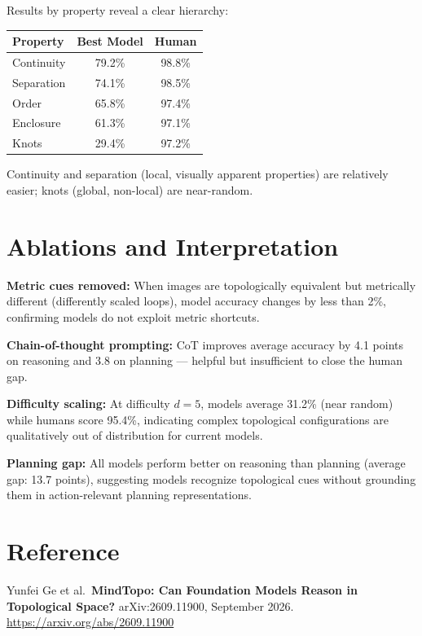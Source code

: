 \documentclass[10pt,twocolumn]{article}
\begin{document}
\vspace{4pt}

Results by property reveal a clear hierarchy:

\begin{center}
\begin{tabular}{lcc}
\toprule
Property & Best Model & Human \\
\midrule
Continuity  & 79.2\% & 98.8\% \\
Separation  & 74.1\% & 98.5\% \\
Order       & 65.8\% & 97.4\% \\
Enclosure   & 61.3\% & 97.1\% \\
Knots       & 29.4\% & 97.2\% \\
\bottomrule
\end{tabular}
\end{center}

Continuity and separation (local, visually apparent properties) are
relatively easier; knots (global, non-local) are near-random.

\section{Ablations and Interpretation}

\textbf{Metric cues removed:} When images are topologically equivalent
but metrically different (differently scaled loops), model accuracy
changes by less than 2\%, confirming models do not exploit metric
shortcuts.

\textbf{Chain-of-thought prompting:} CoT improves average accuracy by
4.1 points on reasoning and 3.8 on planning --- helpful but insufficient
to close the human gap.

\textbf{Difficulty scaling:} At difficulty $d = 5$, models average
31.2\% (near random) while humans score 95.4\%, indicating complex
topological configurations are qualitatively out of distribution for
current models.

\textbf{Planning gap:} All models perform better on reasoning than
planning (average gap: 13.7 points), suggesting models recognize
topological cues without grounding them in action-relevant planning
representations.

\section*{Reference}

Yunfei Ge et al.\ \textbf{MindTopo: Can Foundation Models Reason in
Topological Space?} arXiv:2609.11900, September 2026.
\url{https://arxiv.org/abs/2609.11900}
\end{document}
